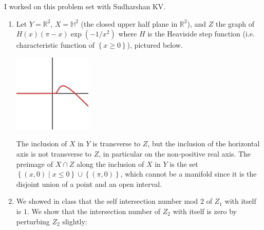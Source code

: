\documentclass[11pt,leqno]{article}
\theoremstyle{plain}
\theoremstyle{definition}
\numberwithin{equation}{section}
\numberwithin{lem}{section}
\newcommand{\cbr}[1]{\left\{#1\right\}}
\begin{document}
I worked on this problem set with Sudharshan KV.
\begin{enumerate}
    \item Let $Y = \mathbb R^2$, $X = \mathbb H^2$ (the closed upper half plane in $\mathbb R^2$), and $Z$ the graph of $H(x)(\pi-x)\exp(-1/x^2)$ where $H$ is the Heaviside step function (i.e. characteristic function of $\cbr{x\geq 0}$), pictured below.
    \begin{center}
        \includegraphics[width=10em]{Z.png}
    \end{center}
    The inclusion of $X$ in $Y$ is transverse to $Z$, but the inclusion of the horizontal axis is not transverse to $Z$, in particular on the non-positive real axis. The preimage of $X\cap Z$ along the inclusion of $X$ in $Y$ is the set $\cbr{(x,0)\mid x\leq 0}\cup \cbr{(\pi,0)}$, which cannot be a manifold since it is the disjoint union of a point and an open interval.
    \item We showed in class that the self intersection number mod $2$ of $Z_1$ with itself is $1$. We show that the intersection number of $Z_2$ with itself is zero by perturbing $Z_2$ slightly: 
    

\end{enumerate}
\end{document}
